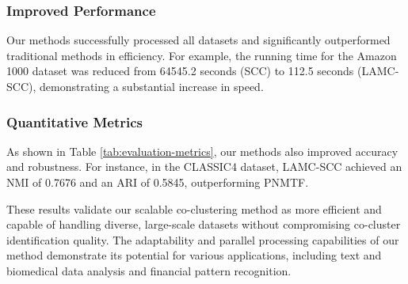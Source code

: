 \subsubsection{Improved Performance} Our methods successfully processed all datasets and significantly outperformed traditional methods in efficiency. For example, the running time for the Amazon 1000 dataset was reduced from 64545.2 seconds (SCC) to 112.5 seconds (LAMC-SCC), demonstrating a substantial increase in speed.

\subsubsection{Quantitative Metrics} As shown in Table \ref{tab:evaluation-metrics}, our methods also improved accuracy and robustness. For instance, in the CLASSIC4 dataset, LAMC-SCC achieved an NMI of 0.7676 and an ARI of 0.5845, outperforming PNMTF.

These results validate our scalable co-clustering method as more efficient and capable of handling diverse, large-scale datasets without compromising co-cluster identification quality. The adaptability and parallel processing capabilities of our method demonstrate its potential for various applications, including text and biomedical data analysis and financial pattern recognition.
